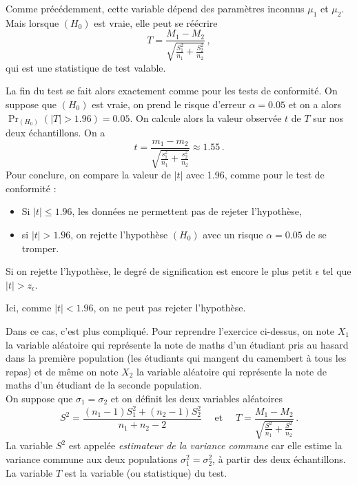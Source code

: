 \documentclass[12pt, a4paper]{book}
\numberwithin{equation}{section}
\begin{document}
Comme précédemment, cette variable dépend des paramètres inconnus $\mu_1$ et $\mu_2$. Mais lorsque $(H_0)$ est vraie, elle peut se réécrire
\[
  T = \frac{M_1-M_2}{\sqrt{\frac{S_1^2}{n_1}+\frac{S_2^2}{n_2}} }\,,
\]
qui est une statistique de test valable.

La fin du test se fait alors exactement comme pour les tests de conformité. On suppose que $(H_0)$ est vraie,
on prend le risque d'erreur $\alpha=0.05$ et on a alors $\Pr_{(H_0)}(|T|>1.96)=0.05$. On calcule alors la valeur observée 
$t$ de $T$ sur nos deux échantillons.
On a 
$$
t= \frac{m_1-m_2}{\sqrt{\frac{s_1^2}{n_1}+\frac{s_2^2}{n_2}} } \approx 1.55 \,.
$$
Pour conclure, on compare la valeur de $|t|$ avec 1.96, comme pour le test de conformité :
\begin{itemize}
\item Si $|t| \leq 1.96$, les données ne permettent pas de rejeter l'hypothèse, 
\item si $|t| > 1.96 $, on rejette l'hypothèse $(H_0)$ avec un risque $\alpha=0.05$ de se tromper. 
\end{itemize}
 Si on rejette l'hypothèse, le degré de signification est encore le plus petit $\epsilon$ 
 tel que $|t|>z_\epsilon$.

Ici, comme $|t|<1.96$, on ne peut pas rejeter l'hypothèse.\\


Dans ce cas, c'est plus compliqué. Pour reprendre l'exercice ci-dessus, on note $X_1$ la variable aléatoire qui représente la note de maths d'un étudiant pris au hasard dans la première population (les étudiants qui mangent du camembert à tous les repas) et de même on note $X_2$ la variable aléatoire qui représente la note 
de maths d'un étudiant de la seconde population.\\

On suppose que $\sigma_1=\sigma_2$ et on définit les deux variables aléatoires
$$
S^2=\frac{(n_1-1)S_1^2+(n_2-1)S_2^2}{n_1 + n_2-2} \quad {\mbox { et }} \quad
T=\frac{M_1-M_2}{\sqrt{\frac{S^2}{n_1}+\frac{S^2}{n_2}} }\,.
$$
La variable $S^2$ est appelée {\it estimateur de la variance commune} car elle estime la variance 
commune aux deux populations $\sigma_1^2=\sigma_2^2$, à partir des deux échantillons. La variable $T$ est la variable (ou statistique) du test.
\end{document}
